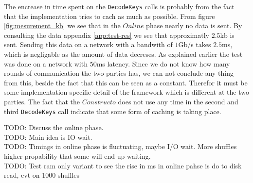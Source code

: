 \documentclass[twoside,11pt,openright]{report}
\newcommand{\todo}[1]{}
\renewcommand{\todo}[1]{{\color{red} TODO: {#1}} \\}
\begin{document}
\bigskip

The encrease in time spent on the \verb|DecodeKeys| calls is probably from the fact that the implementation tries to cach as much as possible. From figure \ref{fig:mesurement_kb} we see that in the $Online$ phase nearly no data is sent. By consulting the data appendix \ref{app:test-res} we see that approximatly $2.5$kb is sent. Sending this data on a network with a bandwith of $1$Gb/s takes $2.5$ms, which is negligable as the amount of data decreses. As explained earlier the test was done on a network with $50$ms latency. Since we do not know how many rounds of communication the two parties has, we can not conclude any thing from this, beside the fact that this can be seen as a constant. Therefor it must be some implementation specific detail of the framework which is different at the two parties. The fact that the $Constructo$ does not use any time in the second and third \verb|DecodeKeys| call indicate that some form of caching is taking place. 

\todo{Discuss the online phase.}
\todo{Main idea is IO wait.}
\todo{Timings in online phase is fluctuating, maybe I/O wait. More shuffles higher propability that some will end up waiting.}
\todo{Test ram only variant to see the rise in ms in online pahse is do to disk read, evt on 1000 shuffles}


\bigskip
\end{document}
